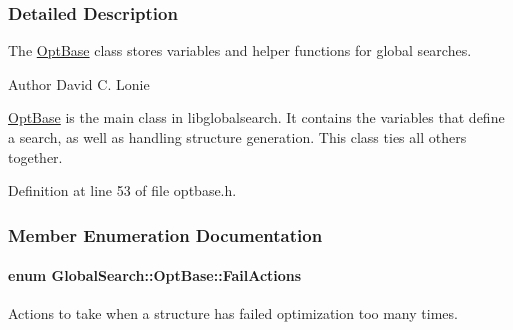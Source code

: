 \subsubsection{Detailed Description}
The \hyperlink{classGlobalSearch_1_1OptBase}{Opt\+Base} class stores variables and helper functions for global searches. 

\begin{DoxyAuthor}{Author}
David C. Lonie
\end{DoxyAuthor}
\hyperlink{classGlobalSearch_1_1OptBase}{Opt\+Base} is the main class in libglobalsearch. It contains the variables that define a search, as well as handling structure generation. This class ties all others together. 

Definition at line 53 of file optbase.\+h.



\subsubsection{Member Enumeration Documentation}
\hypertarget{classGlobalSearch_1_1OptBase_a970b328cd0a36335c34c6b24c6ac2775}{}
\paragraph[{Fail\+Actions}]{\setlength{\rightskip}{0pt plus 5cm}enum {\bf Global\+Search\+::\+Opt\+Base\+::\+Fail\+Actions}}\label{classGlobalSearch_1_1OptBase_a970b328cd0a36335c34c6b24c6ac2775}
Actions to take when a structure has failed optimization too many times.

